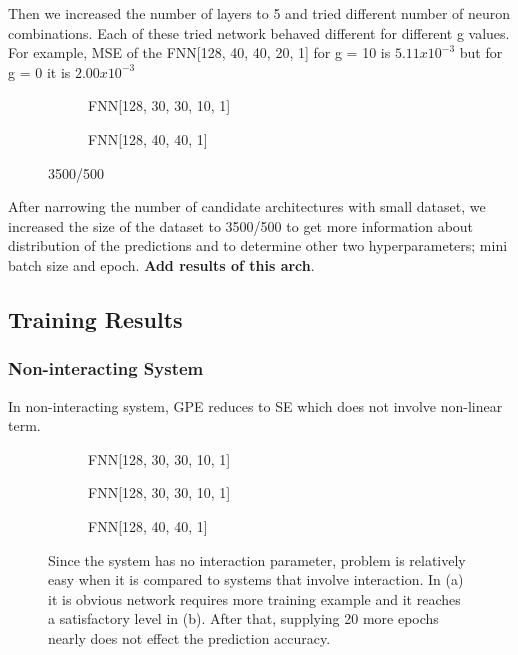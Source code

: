 \documentclass[a4paper,times,12pt]{article}
\begin{document}
Then we increased the number of layers to 5 and tried different number of neuron combinations. Each of these tried network behaved different for different g values. For example, MSE of the FNN[128, 40, 40, 20, 1] for g = 10 is $5.11 x 10^{-3}$ but for g = 0 it is $2.00 x 10^{-3}$


\begin{figure}[H]
    \centering
    \begin{subfigure}[t]{0.45\textwidth}
		\centering
        
        \caption{FNN[128, 30, 30, 10, 1]}
		\label{fig:a}
    \end{subfigure}\hfill
    \begin{subfigure}[t]{0.45\textwidth}
        \centering
        
        \caption{FNN[128, 40, 40, 1]}
		\label{fig:b}
    \end{subfigure}
    \caption{3500/500}
\end{figure}


After narrowing the number of candidate architectures with small dataset, we increased the size of the dataset to 3500/500 to get more information about distribution of the predictions and to determine other two hyperparameters; mini batch size and epoch. \textbf{Add results of this arch}.


\subsection{Training Results}
\subsubsection{Non-interacting System}

In non-interacting system, GPE reduces to SE which does not involve non-linear term. 

\begin{figure}[H]
\label{fig:FFN-g-0}
    \centering
    \begin{subfigure}[t]{0.45\textwidth}
		\centering
        
        \caption{FNN[128, 30, 30, 10, 1]}
		\label{fig:a}
    \end{subfigure}\hfill
    \begin{subfigure}[t]{0.45\textwidth}
		\centering
        
        \caption{FNN[128, 30, 30, 10, 1]}
		\label{fig:b}
    \end{subfigure}\hfill    
    \begin{subfigure}[t]{0.45\textwidth}
        \centering
        
        \caption{FNN[128, 40, 40, 1]}
		\label{fig:c}
    \end{subfigure}
    \caption{Since the system has no interaction parameter, problem is relatively easy when it is compared to systems that involve interaction. In (a) it is obvious network requires more training example and it reaches a satisfactory level in (b). After that, supplying 20 more epochs nearly does not effect the prediction accuracy.}
\end{figure}
\end{document}
